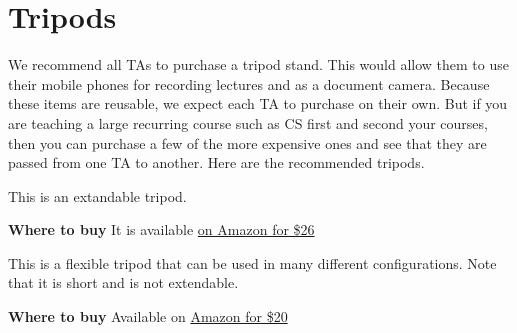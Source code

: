 \section{Tripods}

We recommend all TAs to purchase a tripod stand. This would allow them to use their mobile phones for recording lectures and as a document camera.  
%
Because these items are reusable, we expect each TA to purchase on their own.
%
But if you are teaching a large recurring course such as CS first and
second your courses, then you can purchase a few of the more expensive
ones and see that they are passed from one TA to another.
%
Here are the recommended tripods.

\begin{gram}

This is an extandable tripod.

\textbf{Where to buy}
It is available
\href{https://www.amazon.com/UBeesize-Extendable-Bluetooth-Aluminum-Lightweight/dp/B07NWC3L95/ref=pd_ybh_a_27?_encoding=UTF8&psc=1&refRID=7G79BF5K1T32C0NJXB51}
{on Amazon for \$26}
\end{gram}

\begin{gram}

This is a flexible tripod that can be used in many different
configurations.  Note that it is short and is not extendable. 


\textbf{Where to buy}
Available on 
\href{
https://www.amazon.com/gp/product/B07837W5NX/ref=ppx_yo_dt_b_search_asin_title?ie=UTF8&psc=1}
{Amazon for \$20}
\end{gram}

